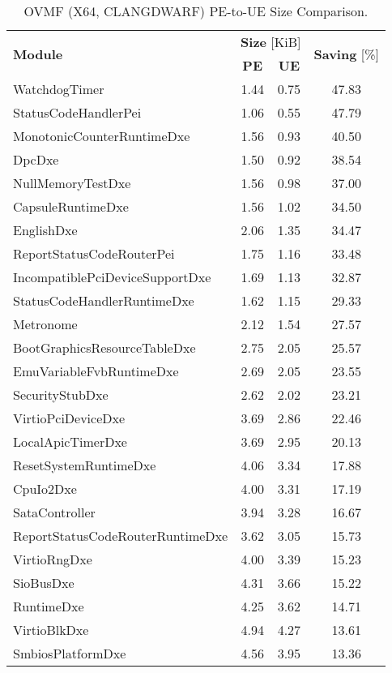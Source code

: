 \begin{longtable}{l c c c}
  \caption{OVMF (X64, CLANGDWARF) PE-to-UE Size Comparison.}\\\\
  \toprule
  \multirow{2}{*}[-2pt]{\textbf{Module}} & \multicolumn{2}{c}{\textbf{Size} [KiB]} & \multirow{2}{*}[-2pt]{\textbf{Saving} [\%]}\\
  \cmidrule{2-3}
  & \textbf{PE} & \textbf{UE} &\\
  \midrule
  WatchdogTimer & 1.44 & 0.75 & 47.83\\
  StatusCodeHandlerPei & 1.06 & 0.55 & 47.79\\
  MonotonicCounterRuntimeDxe & 1.56 & 0.93 & 40.50\\
  DpcDxe & 1.50 & 0.92 & 38.54\\
  NullMemoryTestDxe & 1.56 & 0.98 & 37.00\\
  CapsuleRuntimeDxe & 1.56 & 1.02 & 34.50\\
  EnglishDxe & 2.06 & 1.35 & 34.47\\
  ReportStatusCodeRouterPei & 1.75 & 1.16 & 33.48\\
  IncompatiblePciDeviceSupportDxe & 1.69 & 1.13 & 32.87\\
  StatusCodeHandlerRuntimeDxe & 1.62 & 1.15 & 29.33\\
  Metronome & 2.12 & 1.54 & 27.57\\
  BootGraphicsResourceTableDxe & 2.75 & 2.05 & 25.57\\
  EmuVariableFvbRuntimeDxe & 2.69 & 2.05 & 23.55\\
  SecurityStubDxe & 2.62 & 2.02 & 23.21\\
  VirtioPciDeviceDxe & 3.69 & 2.86 & 22.46\\
  LocalApicTimerDxe & 3.69 & 2.95 & 20.13\\
  ResetSystemRuntimeDxe & 4.06 & 3.34 & 17.88\\
  CpuIo2Dxe & 4.00 & 3.31 & 17.19\\
  SataController & 3.94 & 3.28 & 16.67\\
  ReportStatusCodeRouterRuntimeDxe & 3.62 & 3.05 & 15.73\\
  VirtioRngDxe & 4.00 & 3.39 & 15.23\\
  SioBusDxe & 4.31 & 3.66 & 15.22\\
  RuntimeDxe & 4.25 & 3.62 & 14.71\\
  VirtioBlkDxe & 4.94 & 4.27 & 13.61\\
  SmbiosPlatformDxe & 4.56 & 3.95 & 13.36\\

\end{longtable}
